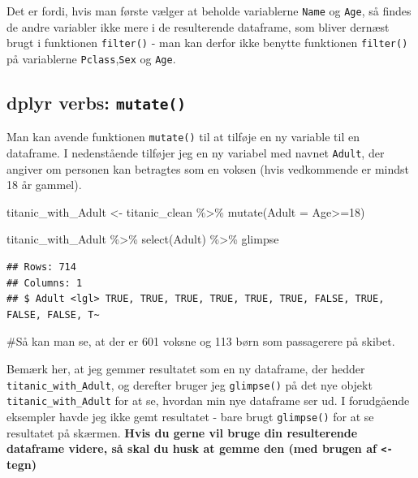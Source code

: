 \documentclass[
]{book}
\newenvironment{Shaded}{\begin{snugshade}}{\end{snugshade}}
\newcommand{\AttributeTok}[1]{\textcolor[rgb]{0.77,0.63,0.00}{#1}}
\newcommand{\DecValTok}[1]{\textcolor[rgb]{0.00,0.00,0.81}{#1}}
\newcommand{\FunctionTok}[1]{\textcolor[rgb]{0.00,0.00,0.00}{#1}}
\newcommand{\NormalTok}[1]{#1}
\newcommand{\OtherTok}[1]{\textcolor[rgb]{0.56,0.35,0.01}{#1}}
\newcommand{\SpecialCharTok}[1]{\textcolor[rgb]{0.00,0.00,0.00}{#1}}
\begin{document}
Det er fordi, hvis man første vælger at beholde variablerne \texttt{Name} og \texttt{Age}, så findes de andre variabler ikke mere i de resulterende dataframe, som bliver dernæst brugt i funktionen \texttt{filter()} - man kan derfor ikke benytte funktionen \texttt{filter()} på variablerne \texttt{Pclass},\texttt{Sex} og \texttt{Age}.

\hypertarget{dplyr-verbs-mutate}{%
\subsection{\texorpdfstring{dplyr verbs: \texttt{mutate()}}{dplyr verbs: mutate()}}\label{dplyr-verbs-mutate}}

Man kan avende funktionen \texttt{mutate()} til at tilføje en ny variable til en dataframe. I nedenstående tilføjer jeg en ny variabel med navnet \texttt{Adult}, der angiver om personen kan betragtes som en voksen (hvis vedkommende er mindst 18 år gammel).

\begin{Shaded}
\begin{Highlighting}[]
\NormalTok{titanic\_with\_Adult }\OtherTok{\textless{}{-}}\NormalTok{ titanic\_clean }\SpecialCharTok{\%\textgreater{}\%} 
    \FunctionTok{mutate}\NormalTok{(}\AttributeTok{Adult =}\NormalTok{ Age}\SpecialCharTok{\textgreater{}=}\DecValTok{18}\NormalTok{)}

\NormalTok{titanic\_with\_Adult }\SpecialCharTok{\%\textgreater{}\%} \FunctionTok{select}\NormalTok{(Adult) }\SpecialCharTok{\%\textgreater{}\%}\NormalTok{ glimpse }
\end{Highlighting}
\end{Shaded}

\begin{verbatim}
## Rows: 714
## Columns: 1
## $ Adult <lgl> TRUE, TRUE, TRUE, TRUE, TRUE, TRUE, FALSE, TRUE, FALSE, FALSE, T~
\end{verbatim}

\#Så kan man se, at der er 601 voksne og 113 børn som passagerere på skibet.

Bemærk her, at jeg gemmer resultatet som en ny dataframe, der hedder \texttt{titanic\_with\_Adult}, og derefter bruger jeg \texttt{glimpse()} på det nye objekt \texttt{titanic\_with\_Adult} for at se, hvordan min nye dataframe ser ud. I forudgående eksempler havde jeg ikke gemt resultatet - bare brugt \texttt{glimpse()} for at se resultatet på skærmen. \textbf{Hvis du gerne vil bruge din resulterende dataframe videre, så skal du husk at gemme den (med brugen af \texttt{\textless{}-} tegn)}
\end{document}
